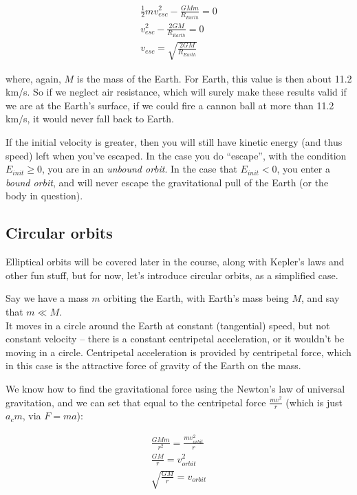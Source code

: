 \begin{align}
\frac{1}{2} m v_{esc}^2 -\frac{G M m}{R_{Earth}} = 0\\
v_{esc}^2 -\frac{2 G M}{R_{Earth}} = 0\\
v_{esc} = \sqrt{\frac{2 G M}{R_{Earth}}}
\end{align}

where, again, $M$ is the mass of the Earth. For Earth, this value is then about 11.2 km/s. So if we neglect air resistance, which will surely make these results valid if we are at the Earth's surface, if we could fire a cannon ball at more than 11.2 km/s, it would never fall back to Earth.

If the initial velocity is greater, then you will still have kinetic energy (and thus speed) left when you've escaped. In the case you do ``escape'', with the condition $E_{init} \ge 0$, you are in an \emph{unbound orbit}. In the case that $E_{init} < 0$, you enter a \emph{bound orbit}, and will never escape the gravitational pull of the Earth (or the body in question).

\subsection{Circular orbits}

Elliptical orbits will be covered later in the course, along with Kepler's laws and other fun stuff, but for now, let's introduce circular orbits, as a simplified case.

Say we have a mass $m$ orbiting the Earth, with Earth's mass being $M$, and say that $m \ll M$.\\
It moves in a circle around the Earth at constant (tangential) speed, but not constant velocity -- there is a constant centripetal acceleration, or it wouldn't be moving in a circle. Centripetal acceleration is provided by centripetal force, which in this case is the attractive force of gravity of the Earth on the mass.

We know how to find the gravitational force using the Newton's law of universal gravitation, and we can set that equal to the centripetal force $\frac{m v^2}{r}$ (which is just $a_c m$, via $F = m a$):

\begin{align}
\frac{G M m}{r^2} = \frac{m v_{orbit}^2}{r}\\
\frac{G M}{r} = v_{orbit}^2\\
\sqrt{\frac{G M}{r}} = v_{orbit}
\end{align}

